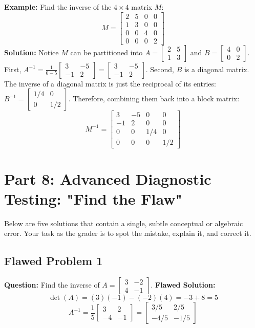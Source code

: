 \documentclass[12pt]{article}
\begin{document}
\textbf{Example:} Find the inverse of the $4 \times 4$ matrix $M$:
\[ M = \begin{bmatrix} 2 & 5 & 0 & 0 \\ 1 & 3 & 0 & 0 \\ 0 & 0 & 4 & 0 \\ 0 & 0 & 0 & 2 \end{bmatrix} \]
\textbf{Solution:} Notice $M$ can be partitioned into $A = \begin{bmatrix} 2 & 5 \\ 1 & 3 \end{bmatrix}$ and $B = \begin{bmatrix} 4 & 0 \\ 0 & 2 \end{bmatrix}$.
First, $A^{-1} = \frac{1}{6-5} \begin{bmatrix} 3 & -5 \\ -1 & 2 \end{bmatrix} = \begin{bmatrix} 3 & -5 \\ -1 & 2 \end{bmatrix}$.
Second, $B$ is a diagonal matrix. The inverse of a diagonal matrix is just the reciprocal of its entries: $B^{-1} = \begin{bmatrix} 1/4 & 0 \\ 0 & 1/2 \end{bmatrix}$.
Therefore, combining them back into a block matrix:
\[ M^{-1} = \begin{bmatrix} 3 & -5 & 0 & 0 \\ -1 & 2 & 0 & 0 \\ 0 & 0 & 1/4 & 0 \\ 0 & 0 & 0 & 1/2 \end{bmatrix} \]

\newpage
\section{Part 8: Advanced Diagnostic Testing: "Find the Flaw"}

Below are five solutions that contain a single, subtle conceptual or algebraic error. Your task as the grader is to spot the mistake, explain it, and correct it.

\subsection{Flawed Problem 1}
\textbf{Question:} Find the inverse of $A = \begin{bmatrix} 3 & -2 \\ 4 & -1 \end{bmatrix}$.
\textbf{Flawed Solution:}
\[ \det(A) = (3)(-1) - (-2)(4) = -3 + 8 = 5 \]
\[ A^{-1} = \frac{1}{5} \begin{bmatrix} 3 & 2 \\ -4 & -1 \end{bmatrix} = \begin{bmatrix} 3/5 & 2/5 \\ -4/5 & -1/5 \end{bmatrix} \]
\end{document}
